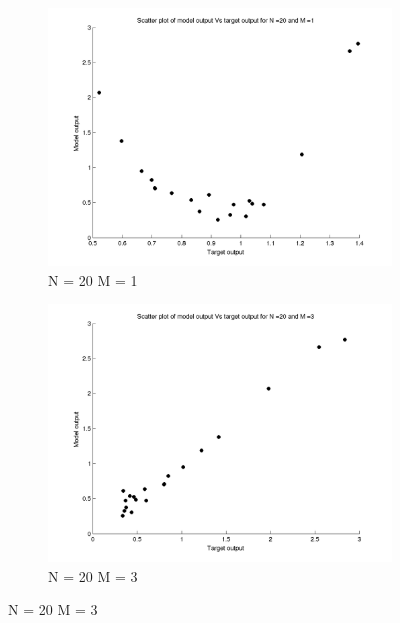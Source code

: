 \documentclass{article}
\begin{document}
\begin{figure}[H]

\begin{subfigure}{.5\textwidth}
\centering
\includegraphics[width=\linewidth]{Scatter_1/VaryingM_N20M1}
\caption{N = 20 M = 1}
\end{subfigure}
\begin{subfigure}{.5\textwidth}
\includegraphics[width=\linewidth]{Scatter_1/VaryingM_N20M3}
\caption{N = 20 M = 3}
\end{subfigure}



\end{figure}
\end{document}
